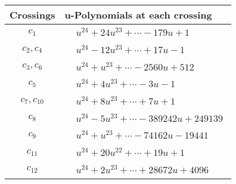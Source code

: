\documentclass[1p]{elsarticle_modified}
\theoremstyle{definition}
\begin{document}
\begin{tabular}{m{50pt}|m{274pt}}
Crossings & \hspace{64pt}u-Polynomials at each crossing \\
\hline $$\begin{aligned}c_{1}\end{aligned}$$&$\begin{aligned}
&u^{24}+24 u^{23}+\cdots-179 u+1
\end{aligned}$\\
\hline $$\begin{aligned}c_{2},c_{4}\end{aligned}$$&$\begin{aligned}
&u^{24}-12 u^{23}+\cdots+17 u-1
\end{aligned}$\\
\hline $$\begin{aligned}c_{3},c_{6}\end{aligned}$$&$\begin{aligned}
&u^{24}+u^{23}+\cdots-2560 u+512
\end{aligned}$\\
\hline $$\begin{aligned}c_{5}\end{aligned}$$&$\begin{aligned}
&u^{24}+4 u^{23}+\cdots-3 u-1
\end{aligned}$\\
\hline $$\begin{aligned}c_{7},c_{10}\end{aligned}$$&$\begin{aligned}
&u^{24}+8 u^{23}+\cdots+7 u+1
\end{aligned}$\\
\hline $$\begin{aligned}c_{8}\end{aligned}$$&$\begin{aligned}
&u^{24}-5 u^{23}+\cdots-389242 u+249139
\end{aligned}$\\
\hline $$\begin{aligned}c_{9}\end{aligned}$$&$\begin{aligned}
&u^{24}+u^{23}+\cdots-74162 u-19441
\end{aligned}$\\
\hline $$\begin{aligned}c_{11}\end{aligned}$$&$\begin{aligned}
&u^{24}+20 u^{22}+\cdots+19 u+1
\end{aligned}$\\
\hline $$\begin{aligned}c_{12}\end{aligned}$$&$\begin{aligned}
&u^{24}+2 u^{23}+\cdots+28672 u+4096
\end{aligned}$\\
\hline
\end{tabular}\\~\\
\end{document}
